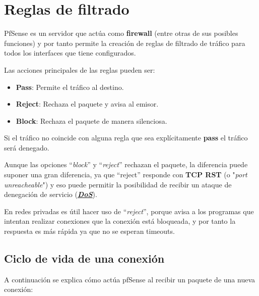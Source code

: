 \chapter{Reglas de filtrado}
PfSense es un servidor que actúa como \textbf{firewall} (entre otras de sus posibles funciones) y por tanto permite la creación de reglas de filtrado de tráfico para todos los interfaces que tiene configurados.


Las acciones principales de las reglas pueden ser:

\begin{itemize}
    \item \textbf{Pass}: Permite el tráfico al destino.
    \item \textbf{Reject}: Rechaza el paquete y avisa al emisor.
    \item \textbf{Block}: Rechaza el paquete de manera silenciosa.
\end{itemize}

Si el tráfico no coincide con alguna regla que sea explícitamente \textbf{pass} el tráfico será denegado.


Aunque las opciones “\textit{block}” y “\textit{reject}” rechazan el paquete, la diferencia puede suponer una gran diferencia, ya que “reject” responde con \textbf{TCP RST }(o "\textit{port unreacheable}") y eso puede permitir la posibilidad de recibir un ataque de denegación de servicio (\textbf{\textit{\href{https://es.wikipedia.org/wiki/Ataque_de_denegaci\%C3\%B3n_de_servicio}{DoS}}}).


En redes privadas es útil hacer uso de “\textit{reject}”, porque avisa a los programas que intentan realizar conexiones que la conexión está bloqueada, y por tanto la respuesta es más rápida ya que no se esperan timeouts.

\hypertarget{ciclo_vida_conexiones}{}
\section{Ciclo de vida de una conexión}
A continuación se explica cómo actúa pfSense al recibir un paquete de una nueva conexión:

